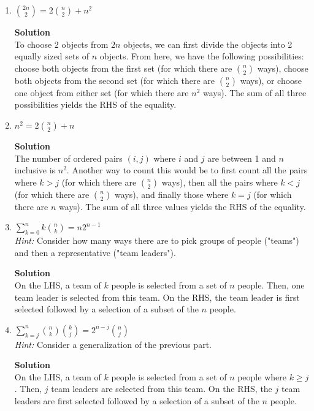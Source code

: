 \documentclass[11pt]{article}
\newenvironment{Parts}{\begin{enumerate}[label=(\alph*)]}{\end{enumerate}}
\newcommand*{\Part}{\item}
\newenvironment{Answer}{\vspace{10pt}\begin{mdframed}\textbf{Solution}\\}{\end{mdframed}\vfill\pagebreak[3]}
\newenvironment{Answer}{\vspace{10pt}}{\vfill\pagebreak[3]}
\begin{document}
\begin{Parts}
\Part $\binom{2n}{2} = 2 \binom{n}{2} + n^2$
\begin{Answer}
    To choose 2 objects from $2n$ objects, we can first divide the objects into 2 equally sized sets of $n$ objects. From here, we have the following possibilities: choose both objects from the first set (for which there are $\binom{n}{2}$ ways), choose both objects from the second set (for which there are $\binom{n}{2}$ ways), or choose one object from  either set (for which there are $n^2$ ways). The sum of all three possibilities yields the RHS of the equality.  
\end{Answer}

\Part $n^2 = 2 \binom{n}{2} + n$
\begin{Answer}
    The number of ordered pairs $(i,j)$ where $i$ and $j$ are between 1 and $n$ inclusive is $n^2$. Another way to count this would be to first count all the pairs where $k>j$ (for which there are $\binom{n}{2}$ ways), then all the pairs where $k<j$ (for which there are $\binom{n}{2}$ ways), and finally those where $k=j$ (for which there are $n$ ways). The sum of all three values yields the RHS of the equality.
\end{Answer}

\Part $\sum_{k=0}^n k {n \choose k} = n2^{n-1}$ \\
\textit{Hint:} Consider how many ways there are to pick groups of people ("teams") and then a representative ("team leaders").
\begin{Answer}
    On the LHS, a team of $k$ people is selected from a set of $n$ people. Then, one team leader is selected from this team. On the RHS, the team leader is first selected followed by a selection of a subset of the $n$ people. 
\end{Answer}

\Part $\sum_{k=j}^n {n \choose k} {k \choose j} = 2^{n-j} {n \choose j}$ \\
\textit{Hint:} Consider a generalization of the previous part.
\begin{Answer}
    On the LHS, a team of $k$ people is selected from a set of $n$ people where $k \geq j$. Then, $j$ team leaders are selected from this team. On the RHS, the $j$ team leaders are first selected followed by a selection of a subset of the $n$ people. 
\end{Answer}

\end{Parts}

\end{document}
